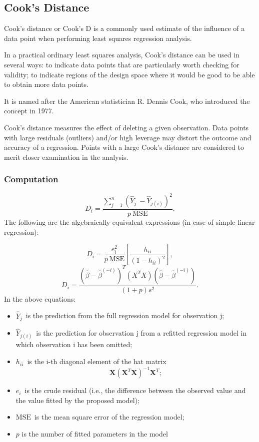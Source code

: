 \documentclass[12pt, a4paper]{article}
\theoremstyle{plain}
\theoremstyle{definition}
\theoremstyle{remark}
\begin{document}
\subsection{Cook's Distance}
Cook's distance or Cook's D is a commonly used estimate of the influence of a data point when performing least squares regression analysis.

In a practical ordinary least squares analysis, Cook's distance can be used in several ways: to indicate data points that are particularly worth checking for validity; to indicate regions of the design space where it would be good to be able to obtain more data points. 

It is named after the American statistician R. Dennis Cook, who introduced the concept in 1977.

Cook's distance measures the effect of deleting a given observation. Data points with large residuals (outliers) and/or high leverage may distort the outcome and accuracy of a regression. Points with a large Cook's distance are considered to merit closer examination in the analysis.

\subsubsection{Computation}
\[ D_i = \frac{ \sum_{j=1}^n (\hat Y_j\ - \hat Y_{j(i)})^2 }{p \ \mathrm{MSE}} .\]
The following are the algebraically equivalent expressions (in case of simple linear regression):

\[ D_i = \frac{e_i^2}{p \ \mathrm{MSE}}\left[\frac{h_{ii}}{(1-h_{ii})^2}\right],\]
\[ D_i = \frac{ (\hat \beta - \hat {\beta}^{(-i)})^T(X^TX)(\hat \beta - \hat {\beta}^{(-i)}) } {(1+p)s^2}.\]
In the above equations:

\begin{itemize}
\item $\hat Y_j \,$ is the prediction from the full regression model for observation j;
\item $\hat Y_{j(i)}\,$ is the prediction for observation j from a refitted regression model in which observation i has been omitted;
\item $h_{ii} \,$ is the i-th diagonal element of the hat matrix 
\[ \mathbf{X}\left(\mathbf{X}^T\mathbf{X}\right)^{-1}\mathbf{X}^T;\]
\item $e_i \,$ is the crude residual (i.e., the difference between the observed value and the value fitted by the proposed model);
 \item $\mathrm{MSE} \,$ is the mean square error of the regression model;
\item $p$ is the number of fitted parameters in the model
\end{itemize}
\end{document}
